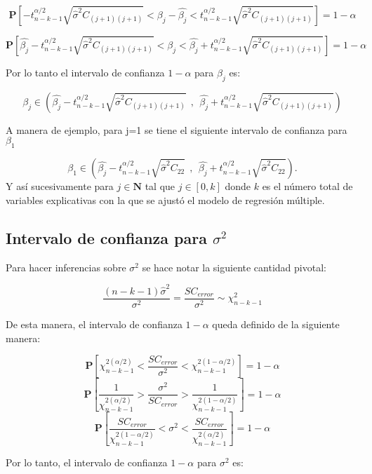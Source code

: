 \documentclass[a4paper,oneside,openany]{book}
\begin{document}
\[\mathbf{P} \left[-t^{\alpha/2}_{n-k-1}{\sqrt{\hat{\sigma}^2C_{(j+1)(j+1)}}} < \beta_{j}-\hat{\beta_{j}} < t^{\alpha/2}_{n-k-1}{\sqrt{\hat{\sigma}^2C_{(j+1)(j+1)}}} \right]= 1- \alpha\]

\[\mathbf{P} \left[\hat{\beta_{j}}-t^{\alpha/2}_{n-k-1}{\sqrt{\hat{\sigma}^2C_{(j+1)(j+1)}}} < \beta_{j} < \hat{\beta_{j}}+t^{\alpha/2}_{n-k-1}{\sqrt{\hat{\sigma}^2C_{(j+1)(j+1)}}} \right]= 1- \alpha\]

Por lo tanto el intervalo de confianza \(1-\alpha\) para \(\beta_{j}\)
es:

\[\beta_{j} \in \left(\hat{\beta_{j}}-t^{\alpha/2}_{n-k-1}{\sqrt{\hat{\sigma}^2C_{(j+1)(j+1)}}} \ \ , \ \ \hat{\beta_{j}}+t^{\alpha/2}_{n-k-1}{\sqrt{\hat{\sigma}^2C_{(j+1)(j+1)}}} \right)\]

A manera de ejemplo, para j=1 se tiene el siguiente intervalo de
confianza para \(\beta_1\)

\[\beta_{1} \in \left(\hat{\beta_{j}}-t^{\alpha/2}_{n-k-1}{\sqrt{\hat{\sigma}^2C_{22}}} \ \ , \ \ \hat{\beta_{j}}+t^{\alpha/2}_{n-k-1}{\sqrt{\hat{\sigma}^2C_{22}}} \right).\]
Y así sucesivamente para \(j \in \mathbf{N}\) tal que \(j \in [0,k]\)
donde \(k\) es el número total de variables explicativas con la que se
ajustó el modelo de regresión múltiple.

\subsection{\texorpdfstring{Intervalo de confianza para
\(\sigma^2\)}{Intervalo de confianza para \textbackslash{}sigma\^{}2}}\label{intervalo-de-confianza-para-sigma2-1}

Para hacer inferencias sobre \(\sigma^2\) se hace notar la siguiente
cantidad pivotal:

\[\frac{(n-k-1)\hat{\sigma}^2}{\sigma^2}=\frac{SC_{error}}{\sigma^2} \sim \chi^2_{n-k-1}\]

De esta manera, el intervalo de confianza \(1-\alpha\) queda definido de
la siguiente manera:

\[\mathbf{P}\left[ \chi^{2(\alpha/2)}_{n-k-1}<\frac{SC_{error}}{\sigma^2}<\chi^{2(1-\alpha/2)}_{n-k-1}\right]=1-\alpha\]
\[\mathbf{P}\left[ \frac{1}{\chi^{2(\alpha/2)}_{n-k-1}}>\frac{\sigma^2}{SC_{error}}>\frac{1}{\chi^{2(1-\alpha/2)}_{n-k-1}}\right]=1-\alpha\]
\[\mathbf{P}\left[ \frac{SC_{error}}{\chi^{2(1-\alpha/2)}_{n-k-1}}<\sigma^2<\frac{SC_{error}}{\chi^{2(\alpha/2)}_{n-k-1}}\right]=1-\alpha\]

Por lo tanto, el intervalo de confianza \(1-\alpha\) para \(\sigma^2\)
es:
\end{document}
